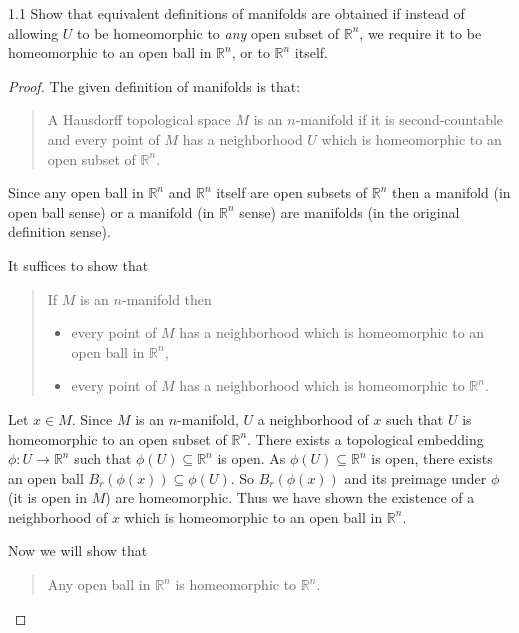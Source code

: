 \begin{exercise}{1.1}
    Show that equivalent definitions of manifolds are obtained if instead of allowing \( U \) to be homeomorphic to \textit{any} open subset of \( \mathbb{R}^{n} \), we require it to be homeomorphic to an open ball in \( \mathbb{R}^{n} \), or to \( \mathbb{R}^{n} \) itself.
\end{exercise}

\begin{proof}
    The given definition of manifolds is that:
    \begin{quotation}
        A Hausdorff topological space \( M \) is an \( n \)-manifold if it is second-countable and every point of \( M \) has a neighborhood \( U \) which is homeomorphic to an open subset of \( \mathbb{R}^{n} \).
    \end{quotation}

    Since any open ball in \( \mathbb{R}^{n} \) and \( \mathbb{R}^{n} \) itself are open subsets of \( \mathbb{R}^{n} \) then a manifold (in open ball sense) or a manifold (in \( \mathbb{R}^{n} \) sense) are manifolds (in the original definition sense).

    It suffices to show that
    \begin{quotation}
        If \( M \) is an \( n \)-manifold then
        \begin{itemize}
            \item every point of \( M \) has a neighborhood which is homeomorphic to an open ball in \( \mathbb{R}^{n} \),
            \item every point of \( M \) has a neighborhood which is homeomorphic to \( \mathbb{R}^{n} \).
        \end{itemize}
    \end{quotation}

    Let \( x \in M \). Since \( M \) is an \( n \)-manifold, \( U \) a neighborhood of \( x \) such that \( U \) is homeomorphic to an open subset of \( \mathbb{R}^{n} \). There exists a topological embedding \( \phi: U \to \mathbb{R}^{n} \) such that \( \phi(U) \subseteq \mathbb{R}^{n} \) is open. As \( \phi(U) \subseteq \mathbb{R}^{n} \) is open, there exists an open ball \( B_{r}(\phi(x)) \subseteq \phi(U) \). So \( B_{r}(\phi(x)) \) and its preimage under \( \phi \) (it is open in \( M \)) are homeomorphic. Thus we have shown the existence of a neighborhood of \( x \) which is homeomorphic to an open ball in \( \mathbb{R}^{n} \).

    Now we will show that
    \begin{quotation}
        Any open ball in \( \mathbb{R}^{n} \) is homeomorphic to \( \mathbb{R}^{n} \).
    \end{quotation}


\end{proof}
